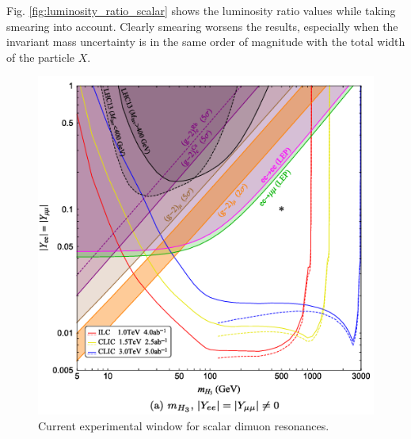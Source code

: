 \documentclass[11pt]{article}
\theoremstyle{definition}
\theoremstyle{remark}
\begin{document}
	Fig. \ref{fig:luminosity_ratio_scalar} shows the luminosity ratio values while taking smearing into account.
	Clearly smearing worsens the results, especially when the invariant mass uncertainty is in the same order of magnitude with the total width of the particle $X$.
	
	\begin{figure}[h]
		\centering
		\includegraphics[width=0.4\linewidth]{xu_fang.png}
		\caption{Current experimental window for scalar dimuon resonances.}
		\label{fig:CLIC_window}
	\end{figure}
\end{document}
